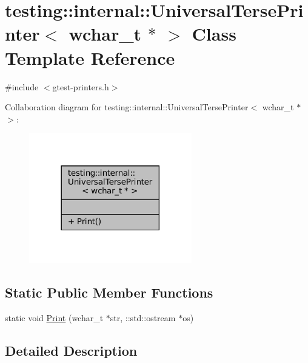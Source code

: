 \hypertarget{classtesting_1_1internal_1_1UniversalTersePrinter_3_01wchar__t_01_5_01_4}{}\section{testing\+:\+:internal\+:\+:Universal\+Terse\+Printer$<$ wchar\+\_\+t $\ast$ $>$ Class Template Reference}
\label{classtesting_1_1internal_1_1UniversalTersePrinter_3_01wchar__t_01_5_01_4}


{\ttfamily \#include $<$gtest-\/printers.\+h$>$}



Collaboration diagram for testing\+:\+:internal\+:\+:Universal\+Terse\+Printer$<$ wchar\+\_\+t $\ast$ $>$\+:
\nopagebreak
\begin{figure}[H]
\begin{center}
\leavevmode
\includegraphics[width=201pt]{classtesting_1_1internal_1_1UniversalTersePrinter_3_01wchar__t_01_5_01_4__coll__graph}
\end{center}
\end{figure}
\subsection*{Static Public Member Functions}
\begin{DoxyCompactItemize}
\item 
static void \hyperlink{classtesting_1_1internal_1_1UniversalTersePrinter_3_01wchar__t_01_5_01_4_a9cdf673b44d19e6879253f30f11cd740}{Print} (wchar\+\_\+t $\ast$str, \+::std\+::ostream $\ast$os)
\end{DoxyCompactItemize}


\subsection{Detailed Description}
